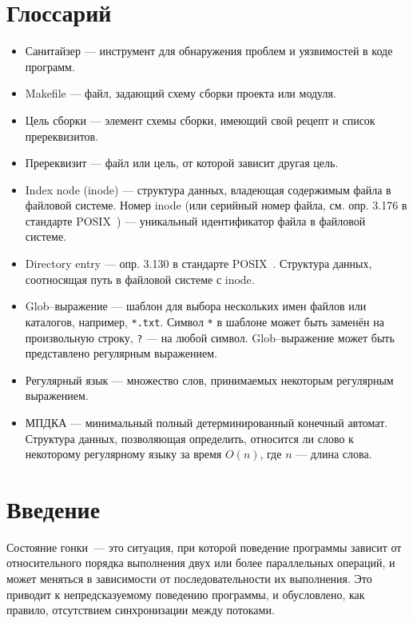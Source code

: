 \section{Глоссарий}
\label{sec:Glossary} 

\begin{itemize}
    \item Санитайзер --- инструмент для обнаружения проблем и уязвимостей в коде программ.
    \item Makefile --- файл, задающий схему сборки проекта или модуля.
    \item Цель сборки --- элемент схемы сборки, имеющий свой рецепт и список пререквизитов.
    \item Пререквизит --- файл или цель, от которой зависит другая цель.
    \item Index node (inode) --- структура данных, владеющая содержимым файла в файловой системе. Номер inode (или серийный номер файла, см. опр. 3.176 в стандарте POSIX~\cite{8277153}) --- уникальный идентификатор файла в файловой системе.
    \item Directory entry --- опр. 3.130 в стандарте POSIX~\cite{8277153}. Структура данных, соотносящая путь в файловой системе с inode.
    \item Glob--выражение --- шаблон для выбора нескольких имен файлов или каталогов, например, \texttt{*.txt}. Символ \texttt{*} в шаблоне может быть заменён на произвольную строку, \texttt{?} --- на любой символ. Glob--выражение может быть представлено регулярным выражением.
    \item Регулярный язык --- множество слов, принимаемых некоторым регулярным выражением.
    \item МПДКА --- минимальный полный детерминированный конечный автомат. Структура данных, позволяющая определить, относится ли слово к некоторому регулярному языку за время $O(n)$, где $n$ --- длина слова.
\end{itemize}

\section{Введение}
\label{sec:Chapter0} 


Состояние гонки~--- это ситуация, при которой поведение программы зависит от относительного порядка выполнения двух или более параллельных операций, и может меняться в зависимости от последовательности их выполнения. Это приводит к непредсказуемому поведению программы, и обусловлено, как правило, отсутствием синхронизации между потоками.

